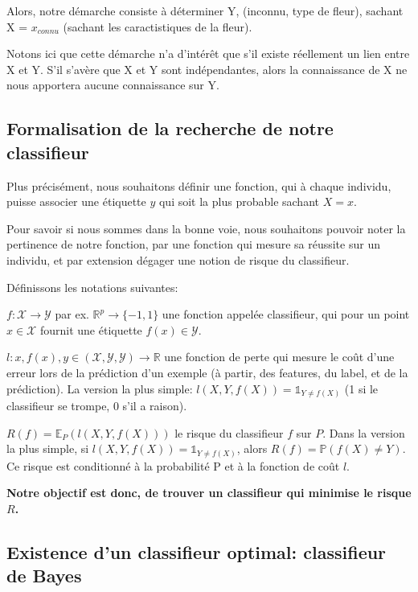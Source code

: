 \documentclass[a4paper]{article}
\theoremstyle{plain}
\begin{document}
Alors, notre démarche consiste à déterminer Y, (inconnu, type de fleur), sachant X = $x_{connu}$ (sachant les caractistiques de la fleur).

Notons ici que cette démarche n'a d'intérêt que s'il existe réellement un lien entre X et Y. S'il s'avère que X et Y sont indépendantes, alors la connaissance de X ne nous apportera aucune connaissance sur Y.

\subsection{Formalisation de la recherche de notre classifieur}

Plus précisément, nous souhaitons définir une fonction, qui à chaque individu, puisse associer une étiquette $y$ qui soit la plus probable sachant $X=x$.

Pour savoir si nous sommes dans la bonne voie, nous souhaitons pouvoir noter la pertinence de notre fonction, par une fonction qui mesure sa réussite sur un individu, et par extension dégager une notion de risque du classifieur.


\begin{outline}
\1 Définissons les notations suivantes:

\2 $f: \mathcal{X} \rightarrow \mathcal{Y}$ par ex. $ \mathbb{R}^p \rightarrow \{-1,1\} $ une fonction appelée classifieur, qui pour un point $x \in \mathcal{X}$ fournit une étiquette  $f(x) \in \mathcal{Y}$.

\2 $ \mathit{l}: x, f(x), y \in (\mathcal{X}, \mathcal{Y}, \mathcal{Y}) \rightarrow \mathbb{R} $ une fonction de perte qui mesure le coût d’une erreur lors de la prédiction d’un exemple (à partir, des features, du label, et de la prédiction). La version la plus simple: $l(X,Y,f(X))= \mathds{1}_{Y\neq f(X)}$ (1 si le classifieur se trompe, 0 s'il a raison).

\2 $R(f)= \mathbb{E}_P(l(X,Y,f(X)))$ le risque du classifieur $f$ sur $P$. Dans la version la plus simple, si $l(X,Y,f(X))= \mathds{1}_{Y\neq f(X)}$, alors $R(f)= \mathbb{P}(f(X)\neq Y)$. Ce risque est conditionné à la probabilité P et à la fonction de coût $l$.
 
\end{outline}

\textbf{Notre objectif est donc, de trouver un classifieur qui minimise le risque $R$.}

\subsection{Existence d'un classifieur optimal: classifieur de Bayes}
\end{document}
